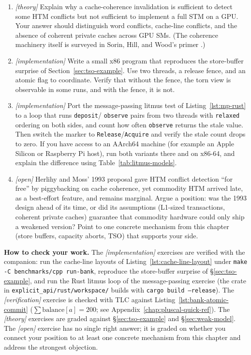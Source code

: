 \begin{enumerate}
\item \emph{[theory]} Explain why a cache-coherence invalidation is
sufficient to detect some HTM conflicts but not sufficient to
implement a full STM on a GPU. Your answer should distinguish word
conflicts, cache-line conflicts, and the absence of coherent private
caches across GPU SMs.  (The coherence machinery itself is surveyed in
Sorin, Hill, and Wood's primer \cite{sorin11primer}.)

\item \emph{[implementation]} Write a small x86 program that reproduces
the store-buffer surprise of Section~\ref{sec:tso-example}. Use two
threads, a release fence, and an atomic flag to coordinate. Verify
that without the fence, the torn view is observable in some runs, and
with the fence, it is not.

\item \emph{[implementation]} Port the message-passing litmus test of
Listing~\ref{lst:mp-rust} to a loop that runs \texttt{deposit}/
\texttt{observe} pairs from two threads with \texttt{relaxed} ordering
on both sides, and count how often \texttt{observe} returns the stale
value. Then switch the marker to \texttt{Release}/\texttt{Acquire} and
verify the stale count drops to zero. If you have access to an AArch64
machine (for example an Apple Silicon or Raspberry Pi host), run both
variants there and on x86-64, and explain the difference using
Table~\ref{tab:litmus-models}.

\item \emph{[open]} Herlihy and Moss' 1993 proposal \cite{herlihy93} gave
HTM conflict detection ``for free'' by piggybacking on cache
coherence, yet commodity HTM arrived late, as a best-effort feature,
and remains marginal.  Argue a position: was the 1993 design ahead of
its time, or did its assumptions (L1-sized transactions, coherent
private caches) guarantee that commodity hardware could only ship a
weakened version?  Point to one concrete mechanism from this chapter
(store buffers, capacity aborts, TSO) that supports your side.
\end{enumerate}

\textbf{How to check your work.} The \emph{[implementation]} exercises are
verified with the companion: run the cache-line layouts of
Listing~\ref{lst:cache-line-layout} under \texttt{make -C benchmarks/cpp
run-bank}, reproduce the store-buffer surprise of
\S\ref{sec:tso-example}, and run the Rust litmus loop of the
message-passing exercise (the crate in
\texttt{explicit\_api/rust/workspace/} builds with \texttt{cargo build
--release}).  The \emph{[verification]} exercise is checked with
TLC against Listing~\ref{lst:bank-atomic-commit}
($\sum \mathrm{balance}[a]=200$; see Appendix~\ref{chap:pluscal-quick-ref}).
The \emph{[theory]} exercises are graded against
\S\ref{sec:tso-example} and \S\ref{sec:weak-model}.  The \emph{[open]}
exercise has no single right answer; it is graded on whether you connect
your position to at least one concrete mechanism from this chapter and
address the strongest objection.

